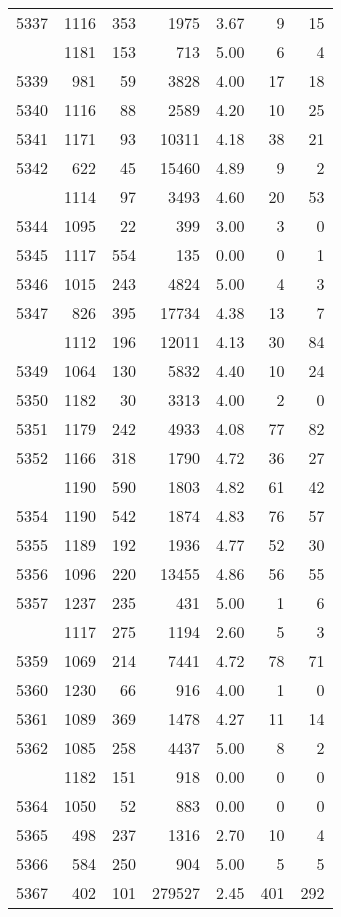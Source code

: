 \documentclass[
]{article}
\begin{document}
\begin{table}
\begin{tabular}[t]{lrrrrrr}
5337 & 1116 & 353 & 1975 & 3.67 & 9 & 15\\
\addlinespace
5338 & 1181 & 153 & 713 & 5.00 & 6 & 4\\
5339 & 981 & 59 & 3828 & 4.00 & 17 & 18\\
5340 & 1116 & 88 & 2589 & 4.20 & 10 & 25\\
5341 & 1171 & 93 & 10311 & 4.18 & 38 & 21\\
5342 & 622 & 45 & 15460 & 4.89 & 9 & 2\\
\addlinespace
5343 & 1114 & 97 & 3493 & 4.60 & 20 & 53\\
5344 & 1095 & 22 & 399 & 3.00 & 3 & 0\\
5345 & 1117 & 554 & 135 & 0.00 & 0 & 1\\
5346 & 1015 & 243 & 4824 & 5.00 & 4 & 3\\
5347 & 826 & 395 & 17734 & 4.38 & 13 & 7\\
\addlinespace
5348 & 1112 & 196 & 12011 & 4.13 & 30 & 84\\
5349 & 1064 & 130 & 5832 & 4.40 & 10 & 24\\
5350 & 1182 & 30 & 3313 & 4.00 & 2 & 0\\
5351 & 1179 & 242 & 4933 & 4.08 & 77 & 82\\
5352 & 1166 & 318 & 1790 & 4.72 & 36 & 27\\
\addlinespace
5353 & 1190 & 590 & 1803 & 4.82 & 61 & 42\\
5354 & 1190 & 542 & 1874 & 4.83 & 76 & 57\\
5355 & 1189 & 192 & 1936 & 4.77 & 52 & 30\\
5356 & 1096 & 220 & 13455 & 4.86 & 56 & 55\\
5357 & 1237 & 235 & 431 & 5.00 & 1 & 6\\
\addlinespace
5358 & 1117 & 275 & 1194 & 2.60 & 5 & 3\\
5359 & 1069 & 214 & 7441 & 4.72 & 78 & 71\\
5360 & 1230 & 66 & 916 & 4.00 & 1 & 0\\
5361 & 1089 & 369 & 1478 & 4.27 & 11 & 14\\
5362 & 1085 & 258 & 4437 & 5.00 & 8 & 2\\
\addlinespace
5363 & 1182 & 151 & 918 & 0.00 & 0 & 0\\
5364 & 1050 & 52 & 883 & 0.00 & 0 & 0\\
5365 & 498 & 237 & 1316 & 2.70 & 10 & 4\\
5366 & 584 & 250 & 904 & 5.00 & 5 & 5\\
5367 & 402 & 101 & 279527 & 2.45 & 401 & 292\\

\end{tabular}
\end{table}
\end{document}
